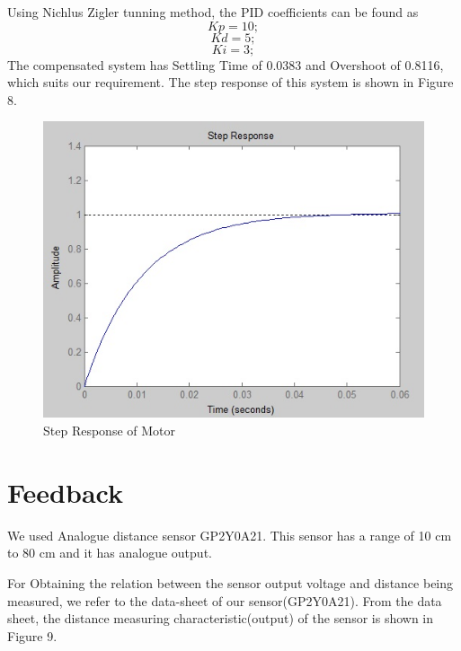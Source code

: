 \documentclass{article}
\begin{document}
 Using Nichlus Zigler tunning method, the PID coefficients can be found as
\[Kp = 10;\]
\[Kd = 5;\]
\[Ki = 3;\]
The compensated system has Settling Time of 0.0383 and Overshoot of 0.8116, which suits our requirement.
The step response of this system is shown in Figure 8.
\begin{figure}[h]
  \includegraphics[width=\linewidth]{motor_resp.jpg}
  \caption{Step Response of Motor}
  \label{fig:boat1}
\end{figure}

\section{Feedback}
We used Analogue distance sensor GP2Y0A21. This sensor has a range of 10 cm to 80 cm and it has analogue output.

For Obtaining the relation between the sensor output voltage and distance being measured, we refer to the data-sheet of our sensor(GP2Y0A21). From the data sheet, the distance measuring characteristic(output) of the sensor is shown in Figure 9.
\end{document}
